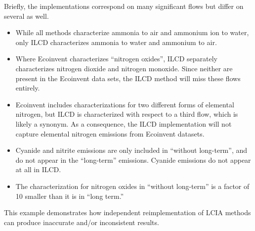 Briefly, the implementations correspond on many significant flows but differ on several as well.
\begin{itemize}
\item While all methods characterize ammonia to air and ammonium ion to water, only ILCD characterizes ammonia to water and ammonium to air.
\item Where Ecoinvent characterizes ``nitrogen oxides'', ILCD separately characterizes nitrogen dioxide and nitrogen monoxide.  Since neither are present in the Ecoinvent data sets, the ILCD method will miss these flows entirely.
\item Ecoinvent includes characterizations for two different forms of elemental nitrogen, but ILCD is characterized with respect to a third flow, which is likely a synonym.  As a consequence, the ILCD implementation will not capture elemental nitrogen emissions from Ecoinvent datasets.
\item Cyanide and nitrite emissions are only included in ``without long-term'', and do not appear in the ``long-term'' emissions.  Cyanide emissions do not appear at all in ILCD.
\item The characterization for nitrogen oxides in ``without long-term'' is a factor of 10 smaller than it is in ``long term.''
\end{itemize}
This example demonstrates how independent reimplementation of LCIA methods can produce inaccurate and/or inconsistent results.


